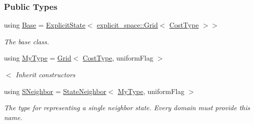 \subsubsection*{Public Types}
\begin{DoxyCompactItemize}
\item 
using \hyperlink{structslb_1_1ext_1_1domain_1_1grid_1_1Grid_a88a3253b98b7f322a609351a3b467c1c}{Base} = \hyperlink{structslb_1_1core_1_1sb_1_1ExplicitState}{Explicit\+State}$<$ \hyperlink{structslb_1_1ext_1_1explicit__space_1_1Grid}{explicit\+\_\+space\+::\+Grid}$<$ \hyperlink{structslb_1_1core_1_1sb_1_1ExplicitState_ae36e0763ad9b7ee7407aa316d4c64f14}{Cost\+Type} $>$$>$\hypertarget{structslb_1_1ext_1_1domain_1_1grid_1_1Grid_a88a3253b98b7f322a609351a3b467c1c}{}\label{structslb_1_1ext_1_1domain_1_1grid_1_1Grid_a88a3253b98b7f322a609351a3b467c1c}

\begin{DoxyCompactList}\small\item\em The base class. \end{DoxyCompactList}\item 
using \hyperlink{structslb_1_1ext_1_1domain_1_1grid_1_1Grid_a03885678f7bc1ee3a2e408439e1ff3a5}{My\+Type} = \hyperlink{structslb_1_1ext_1_1domain_1_1grid_1_1Grid}{Grid}$<$ \hyperlink{structslb_1_1core_1_1sb_1_1ExplicitState_ae36e0763ad9b7ee7407aa316d4c64f14}{Cost\+Type}, uniform\+Flag $>$
\begin{DoxyCompactList}\small\item\em $<$ Inherit constructors \end{DoxyCompactList}\item 
using \hyperlink{structslb_1_1ext_1_1domain_1_1grid_1_1Grid_a4e0d521edf3400571fd0b09e4de106a9}{S\+Neighbor} = \hyperlink{structslb_1_1core_1_1sb_1_1StateNeighbor}{State\+Neighbor}$<$ \hyperlink{structslb_1_1ext_1_1domain_1_1grid_1_1Grid_a03885678f7bc1ee3a2e408439e1ff3a5}{My\+Type}, uniform\+Flag $>$\hypertarget{structslb_1_1ext_1_1domain_1_1grid_1_1Grid_a4e0d521edf3400571fd0b09e4de106a9}{}\label{structslb_1_1ext_1_1domain_1_1grid_1_1Grid_a4e0d521edf3400571fd0b09e4de106a9}

\begin{DoxyCompactList}\small\item\em The type for representing a single neighbor state. Every domain must provide this name. \end{DoxyCompactList}\end{DoxyCompactItemize}
